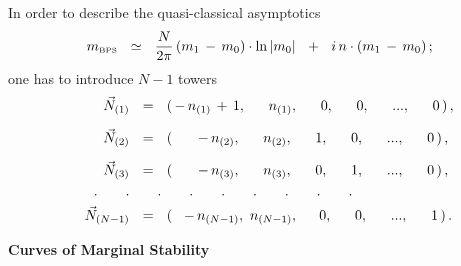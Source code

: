 \documentclass[12pt,letterpaper,landscape,KOMA,smallheadings,calcdimensions,display]{powersem}
\newcommand{\mbps}{m_{\text{\tiny BPS}}}
\begin{document}
\begin{slide}

	In order to describe the quasi-classical asymptotics
\[
\mbps ~~\simeq~~ \frac{N}{2\pi}\,
		( m_1 \,-\, m_0 ) \cdot \ln |m_0 |
	    ~~+~~
	i\, n \cdot ( m_1 \,-\, m_0 )\,;
\]
	one has to introduce $ N - 1 $ towers
\begin{align*}
%
\notag
	\vec{N}_{(1)} & ~~=~~ (\, -\,n_{(1)} \,+\, 1,~~~~\; n_{(1)},~~~~\; 0,~~~~\; 0,~~~~\; ...,~~~~\; 0 \,)\,,  
	\\[2mm]
%
\notag
	\vec{N}_{(2)} & ~~=~~ (\, ~~~~~-\,n_{(2)},~~~~\; n_{(2)},~~~~\; 1,~~~~\; 0,~~~~\; ...,~~~~\; 0 \,)\,,
	\\[2mm]
%
	\vec{N}_{(3)} & ~~=~~ (\, ~~~~~-\,n_{(3)},~~~~\; n_{(3)},~~~~\; 0,~~~~\; 1,~~~~\; ...,~~~~\; 0 \,)\,,
	\\
%
\notag
	\qquad.\qquad.
	              & \qquad.\qquad.\qquad.\qquad.\qquad.\qquad.\qquad.
	\\
%
\notag
	\vec{N}_{(N-1)} & ~~=~~ (\, ~~-\,n_{(N-1)},~ n_{(N-1)},~~~~\, 0,~~~~\; 0,~~~~\; ...,~~~~\; 1 \,)\,.
\end{align*}

\stepwise{
\step{
\vspace{-0.2cm}
\centerline{\textcolor{magenta}{This is the spectrum which satisfies all three criteria}}
}
\step{
\vspace{-0.7cm}
\[
	\mbps ~~=~~ U_0 (m_0) ~~+~~ i\, n_{(k)} \cdot ( m_1 \,-\, m_0 ) ~~+~~ i\, m_k\,,
	\qquad {\scriptstyle k ~=~ 1,\,...,\, N-1\,}.
\]
}
}

\end{slide}


\begin{slide}

\vspace*{3.0cm} 
\begin{center}
\fontsize{35pt}{30pt}\selectfont
\bfseries
	Curves of Marginal Stability
\end{center}
\vspace*{2.0cm} 

\end{slide}
\end{document}

